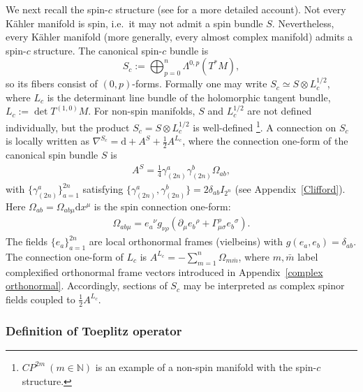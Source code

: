 \documentclass[12pt]{article}
\newcommand{\dif}{\mathrm{d}}
\theoremstyle{definition} %
\theoremstyle{plain} %
\theoremstyle{remark} %
\theoremstyle{underline}
\begin{document}
We next recall the spin-\(c\) structure (see \cite{BTQtextbook, spingeometry} for a more detailed account).
Not every K\"ahler manifold is spin, i.e.\ it may not admit a spin bundle \(S\).
Nevertheless, every K\"ahler manifold (more generally, every almost complex manifold) admits a spin-\(c\) structure.
The canonical spin-\(c\) bundle is
\[
    S_c:=\bigoplus_{p=0}^n \Lambda^{0,p}(T^\ast M),
\]
so its fibers consist of \((0,p)\)-forms.
Formally one may write \(S_c\simeq S\otimes L_c^{1/2}\), where \(L_c\) is the determinant line bundle of the holomorphic tangent bundle, \(L_c:=\det T^{(1,0)}M\).
For non-spin manifolds, \(S\) and \(L_c^{1/2}\) are not defined individually, but the product \(S_c=S\otimes L_c^{1/2}\) is well-defined \footnote{$CP^{2m}\ (m\in\mathbb{N})$ is an example of a non-spin manifold with the spin-\(c\) structure.}.
A connection on \(S_c\) is locally written as \(\nabla^{S_c}=\dif + A^S + \frac12 A^{L_c}\), where the connection one-form of the canonical spin bundle \(S\) is
\begin{align}
    A^S = \frac{1}{4}\gamma_{(2n)}^a\gamma_{(2n)}^b\Omega_{ab},
\end{align}
with \(\{\gamma_{(2n)}^a\}_{a=1}^{2n}\) satisfying \(\{\gamma_{(2n)}^a,\gamma_{(2n)}^b\}=2\delta_{ab}I_{2^n}\) (see
Appendix~\ref{Clifford}).
Here \(\Omega_{ab}=\Omega_{ab\mu}\dif x^\mu\) is the spin connection one-form:
\begin{align}
    \Omega_{ab\mu} = e_a{}^{\nu} g_{\nu \rho}
    (\partial_{\mu} e_{b}{}^{\rho} + \Gamma^{\rho}_{\mu \sigma} e_b{}^{\sigma}).
\end{align}
The fields \(\{e_a\}_{a=1}^{2n}\) are local orthonormal frames (vielbeins) with \(g(e_a,e_b)=\delta_{ab}\).
The connection one-form of \(L_c\) is \(A^{L_c}=-\sum_{m=1}^n\Omega_{m\bar m}\), where \(m,\bar m\) label complexified orthonormal frame vectors introduced in Appendix~\ref{complex orthonormal}.
Accordingly, sections of \(S_c\) may be interpreted as complex spinor fields coupled to \(\frac12 A^{L_c}\).

\subsubsection{Definition of Toeplitz operator}
\end{document}
